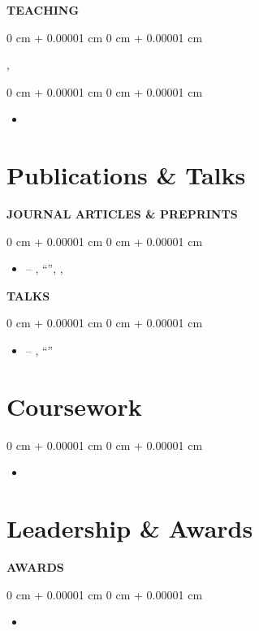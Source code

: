 \documentclass[10pt, letterpaper]{article}
\newenvironment{highlights}{
    \begin{itemize}[
        topsep=0.10 cm,
        parsep=0.10 cm,
        partopsep=0pt,
        itemsep=0pt,
        leftmargin=0 cm + 10pt
    ]
}{
    \end{itemize}
} %
\newenvironment{onecolentry}{
    \begin{adjustwidth}{
        0 cm + 0.00001 cm
    }{
        0 cm + 0.00001 cm
    }
}{
    \end{adjustwidth}
} %
\newenvironment{twocolentry}[2][]{
    \onecolentry
    \def\secondColumn{#2}
    \setcolumnwidth{\fill, 4.5 cm}
    \begin{paracol}{2}
}{
    \switchcolumn \raggedleft \secondColumn
    \end{paracol}
    \endonecolentry
} %
\begin{document}
\textbf{TEACHING}
\vspace{0.2cm}
\begin{twocolentry}{}
    \textbf{}, 
\end{twocolentry}
\begin{onecolentry}
\begin{highlights}
\item {}
\end{highlights}
\end{onecolentry}

\section{Publications \& Talks}
\textbf{\MakeUppercase{Journal Articles \& Preprints}}
\begin{onecolentry}
\begin{highlights}
 \item {} -- , ``'', , 
\end{highlights}
\end{onecolentry}

\vspace{0.2cm}
\textbf{\MakeUppercase{Talks}}
\begin{onecolentry}
\begin{highlights}
\item {} -- , ``''
\end{highlights}
\end{onecolentry}

\section{Coursework}
\begin{onecolentry}
\begin{highlights}
    \item {}
\end{highlights}
\end{onecolentry}

\section{Leadership \& Awards}
\textbf{AWARDS}
\begin{onecolentry}
\begin{highlights}
\item {}
\end{highlights}
\end{onecolentry}
\end{document}
